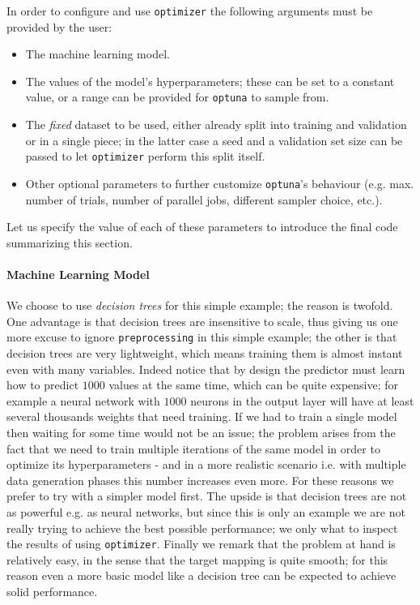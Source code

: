 In order to configure and use \texttt{optimizer} the following arguments must be provided by the user:
\begin{itemize} %
    \item The machine learning model.
    \item The values of the model's hyperparameters; these can be set to a constant value, or a range can be provided for \texttt{optuna} to sample from.
    \item The \emph{fixed} dataset to be used, either already split into training and validation or in a single piece; in the latter case a seed and a validation set size can be passed to let \texttt{optimizer} perform this split itself.
    \item Other optional parameters to further customize \texttt{optuna}'s behaviour (e.g. max. number of trials, number of parallel jobs, different sampler choice, etc.).
\end{itemize}
Let us specify the value of each of these parameters to introduce the final code summarizing this section.
\paragraph{Machine Learning Model}
We choose to use \emph{decision trees} for this simple example; the reason is twofold. One advantage is that decision trees are insensitive to scale, thus giving us one more excuse to ignore \texttt{preprocessing} in this simple example; the other is that decision trees are very lightweight, which means training them is almost instant even with many variables. Indeed notice that by design the predictor must learn how to predict $1000$ values at the same time, which can be quite expensive; for example a neural network with $1000$ neurons in the output layer will have at least several thousands weights that need training. If we had to train a single model then waiting for some time would not be an issue; the problem arises from the fact that we need to train multiple iterations of the same model in order to optimize its hyperparameters - and in a more realistic scenario i.e. with multiple data generation phases this number increases even more.
For these reasons we prefer to try with a simpler model first. The upside is that decision trees are not as powerful e.g. as neural networks, but since this is only an example we are not really trying to achieve the best possible performance; we only what to inspect the results of using \texttt{optimizer}.
Finally we remark that the problem at hand is relatively easy, in the sense that the target mapping is quite smooth; for this reason even a more basic model like a decision tree can be expected to achieve solid performance.

